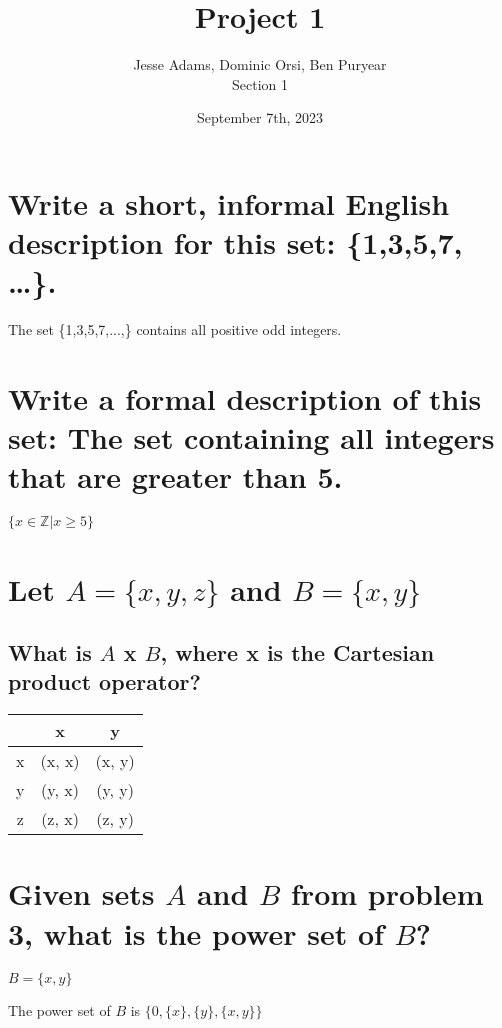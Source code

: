 \documentclass{article}
\title{Project 1}
\author{Jesse Adams, Dominic Orsi, Ben Puryear\\Section 1}
\date{September 7th, 2023}
\begin{document}
\maketitle

\section{Write a short, informal English description for this set: \{1,3,5,7, …\}.}
\begin{center}
	The set \{1,3,5,7,...,\} contains all positive odd integers.
\end{center}

\section{Write a formal description of this set: The set containing all integers that are greater than 5.}
\begin{center}
	$\{x \in \mathbb{Z} | x \ge 5 \}$
\end{center}

\section{Let $A = \{x,y,z\}$ and $B = \{x,y\}$}
\subsection{What is $A$ x $B$, where x is the Cartesian product operator?}
\begin{center}
	\begin{tabular}{ |c|c|c| }
		  & x      & y      \\
		\hline
		x & (x, x) & (x, y) \\
		y & (y, x) & (y, y) \\
		z & (z, x) & (z, y) \\
	\end{tabular}
\end{center}

\section{Given sets $A$ and $B$ from problem 3, what is the power set of $B$?}
$B = \{x,y\}$
\begin{center}
	The power set of $B$ is $\{0, \{x\},\{y\}, \{x,y\}\}$
\end{center}
\end{document}
